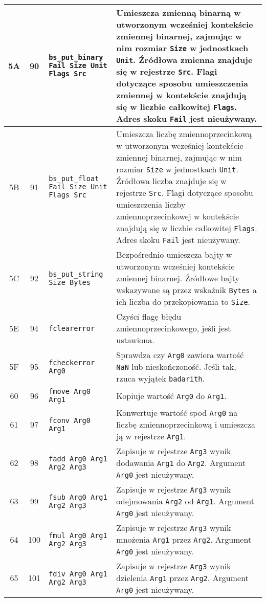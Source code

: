 \begin{longtable}{|c|c|p{5cm}|p{7cm}|}
\hline
5A & 90 & \texttt{bs\_put\_binary  Fail Size Unit Flags Src} & Umieszcza zmienną binarną w utworzonym wcześniej kontekście zmiennej binarnej, zajmując w nim rozmiar \texttt{Size} w jednostkach \texttt{Unit}. Źródłowa zmienna znajduje się w rejestrze \texttt{Src}. Flagi dotyczące sposobu umieszczenia zmiennej w kontekście znajdują się w liczbie całkowitej \texttt{Flags}. Adres skoku \texttt{Fail} jest nieużywany. \\
\hline
5B & 91 & \texttt{bs\_put\_float Fail Size Unit Flags Src} & Umieszcza liczbę zmiennoprzecinkową w utworzonym wcześniej kontekście zmiennej binarnej, zajmując w nim rozmiar \texttt{Size} w jednostkach \texttt{Unit}. Źródłowa liczba znajduje się w rejestrze \texttt{Src}. Flagi dotyczące sposobu umieszczenia liczby zmiennoprzecinkowej w kontekście znajdują się w liczbie całkowitej \texttt{Flags}. Adres skoku \texttt{Fail} jest nieużywany. \\
\hline
5C & 92 & \texttt{bs\_put\_string Size Bytes} & Bezpośrednio umieszcza bajty w utworzonym wcześniej kontekście zmiennej binarnej. Źródłowe bajty wskazywane są przez wskaźnik \texttt{Bytes} a ich liczba do przekopiowania to \texttt{Size}. \\
\hline
5E & 94 & \texttt{fclearerror} &  Czyści flagę błędu zmiennoprzecinkowego, jeśli jest ustawiona. \\
\hline
5F & 95 & \texttt{fcheckerror Arg0} &  Sprawdza czy \texttt{Arg0} zawiera wartość \texttt{NaN} lub nieskończoność. Jeśli tak, rzuca wyjątek \texttt{badarith}.\\
\hline
60 & 96 & \texttt{fmove Arg0 Arg1} & Kopiuje wartość \texttt{Arg0} do \texttt{Arg1}. \\
\hline
61 & 97 & \texttt{fconv Arg0 Arg1} & Konwertuje wartość spod \texttt{Arg0} na liczbę zmiennoprzecinkową i umieszcza ją w rejestrze \texttt{Arg1}.\\
\hline
62 & 98 & \texttt{fadd Arg0 Arg1 Arg2 Arg3} & Zapisuje w rejestrze \texttt{Arg3} wynik dodawania \texttt{Arg1} do \texttt{Arg2}. Argument \texttt{Arg0} jest nieużywany. \\
\hline
63 & 99 & \texttt{fsub Arg0 Arg1 Arg2 Arg3} & Zapisuje w rejestrze \texttt{Arg3} wynik odejmowania \texttt{Arg2} od \texttt{Arg1}. Argument \texttt{Arg0} jest nieużywany.\\
\hline
64 & 100 & \texttt{fmul Arg0 Arg1 Arg2 Arg3} & Zapisuje w rejestrze \texttt{Arg3} wynik mnożenia \texttt{Arg1} przez \texttt{Arg2}. Argument \texttt{Arg0} jest nieużywany. \\
\hline
65 & 101 & \texttt{fdiv Arg0 Arg1 Arg2 Arg3} & Zapisuje w rejestrze \texttt{Arg3} wynik dzielenia \texttt{Arg1} przez \texttt{Arg2}. Argument \texttt{Arg0} jest nieużywany. \\

\end{longtable}
